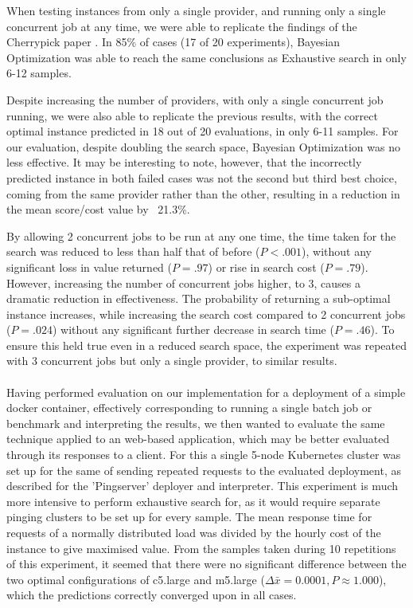 \documentclass{article}
\begin{document}
When testing instances from only a single provider, and running only a single concurrent job at any time, we were able to replicate the findings of the Cherrypick paper \cite{Alipourfard2017}. In 85\% of cases (17 of 20 experiments), Bayesian Optimization was able to reach the same conclusions as Exhaustive search in only 6-12 samples. 

Despite increasing the number of providers, with only a single concurrent job running, we were also able to replicate the previous results, with the correct optimal instance predicted in 18 out of 20 evaluations, in only 6-11 samples. For our evaluation, despite doubling the search space, Bayesian Optimization was no less effective.  It may be interesting to note, however, that the incorrectly predicted instance in both failed cases was not the second but third best choice, coming from the same provider rather than the other, resulting in a reduction in the mean score/cost value by ~21.3\%.  

By allowing 2 concurrent jobs to be run at any one time, the time taken for the search was reduced to less than half that of before ($P < .001$), without any significant loss in value returned ($P = .97$) or rise in search cost ($P = .79$). However, increasing the number of concurrent jobs higher, to 3, causes a dramatic reduction in effectiveness. The probability of returning a sub-optimal instance increases, while increasing the search cost compared to 2 concurrent jobs ($P = .024$) without any significant further decrease in search time ($P = .46$). To ensure this held true even in a reduced search space, the experiment was repeated with 3 concurrent jobs but only a single provider, to similar results.


\paragraph{}
Having performed evaluation on our implementation for a deployment of a simple docker container, effectively corresponding to running a single batch job or benchmark and interpreting the results, we then wanted to evaluate the same technique applied to an web-based application, which may be better evaluated through its responses to a client. For this a single 5-node Kubernetes cluster was set up for the same of sending repeated requests to the evaluated deployment, as described for the 'Pingserver' deployer and interpreter. This experiment is much more intensive to perform exhaustive search for, as it would require separate pinging clusters to be set up for every sample. The mean response time for requests of a normally distributed load was divided by the hourly cost of the instance to give maximised value. From the samples taken during 10 repetitions of this experiment, it seemed that there were no significant difference between the two optimal configurations of c5.large and m5.large ($\Delta \bar{x}=0.0001, P \approx 1.000$), which the predictions correctly converged upon in all cases.
\end{document}
